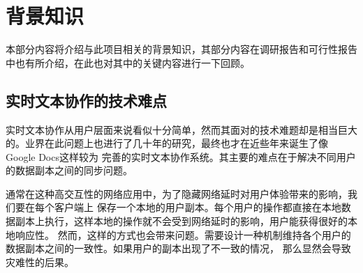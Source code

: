 \documentclass[11pt]{ctexart}
\begin{document}
\section{背景知识}
本部分内容将介绍与此项目相关的背景知识，其部分内容在调研报告和可行性报告中也有所介绍，在此也对其中的关键内容进行一下回顾。
\subsection{实时文本协作的技术难点}
实时文本协作从用户层面来说看似十分简单，然而其面对的技术难题却是相当巨大的。业界在此问题上也进行了几十年的研究，最终也才在近些年来诞生了像Google Docs这样较为
完善的实时文本协作系统。其主要的难点在于解决不同用户的数据副本之间的同步问题。  

通常在这种高交互性的网络应用中，为了隐藏网络延时对用户体验带来的影响，我们要在每个客户端上
保存一个本地的用户副本。每个用户的操作都直接在本地数据副本上执行，这样本地的操作就不会受到网络延时的影响，用户能获得很好的本地响应性。
然而，这样的方式也会带来问题。需要设计一种机制维持各个用户的数据副本之间的一致性。如果用户的副本出现了不一致的情况，
那么显然会导致灾难性的后果。


\nocite{*}


\end{document}
